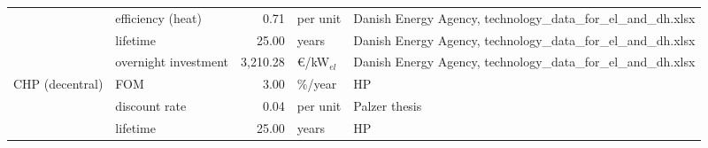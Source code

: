 \begin{longtable}{p{4cm}p{4cm}rp{3cm}p{10cm}}
                      & efficiency (heat) &         0.71 &                      per unit &                                                                                                                                                                                                                                                                        Danish Energy Agency, technology\_data\_for\_el\_and\_dh.xlsx \\
                      & lifetime &        25.00 &                         years &                                                                                                                                                                                                                                                                        Danish Energy Agency, technology\_data\_for\_el\_and\_dh.xlsx \\
                      & overnight investment &     3,210.28 &               \euro/kW$_{el}$ &                                                                                                                                                                                                                                                                        Danish Energy Agency, technology\_data\_for\_el\_and\_dh.xlsx \\
CHP (decentral) & FOM &         3.00 &                       \%/year &                                                                                                                                                                                                                                                                                                                                   HP \\
                      & discount rate &         0.04 &                      per unit &                                                                                                                                                                                                                                                                                                                        Palzer thesis \\
                      & lifetime &        25.00 &                         years &                                                                                                                                                                                                                                                                                                                                   HP \\

\end{longtable}
